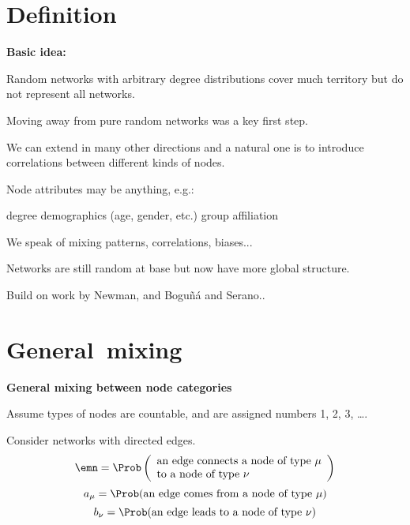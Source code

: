 





\section{Definition}

  \textbf{Basic idea:}

  
  
    Random networks with arbitrary degree distributions
    cover much territory but do not represent
    all networks.
  
    Moving away from pure random networks was a key first step.
  
    We can extend in many other directions and a natural
    one is to introduce correlations between 
    different kinds of nodes.
  
    Node attributes may be anything, e.g.:
    
     degree
     demographics (age, gender, etc.)
     group affiliation
    
  
    We speak of mixing patterns, correlations, biases...
  
    Networks are still random at base but now have more 
    global structure.
  
    Build on work by Newman\cite{newman2002a,newman2003e},
    and Bogu\~{n}\'{a} and Serano.\cite{boguna2005a}.
  
  

\section{General\ mixing}

  \textbf{General mixing between node categories}

  
  
    Assume types of nodes are countable, and are
    assigned numbers 1, 2, 3, \ldots.
  
    Consider networks with directed edges.
    {
      $$
      \emn
      = \Prob 
      \left(
        \begin{array}{ll}
          \mbox{an edge connects a node of type $\mu$} \\ 
          \mbox{to a node of type $\nu$}
        \end{array}
      \right)
      $$
    }
    {
      $$
      a_{\mu} 
      = \Prob (\mbox{an edge comes from a node of type $\mu$})
      $$
    }
    {
      $$
      b_{\nu} 
      = \Prob (\mbox{an edge leads to a node of type $\nu$})
      $$
    }  
  
